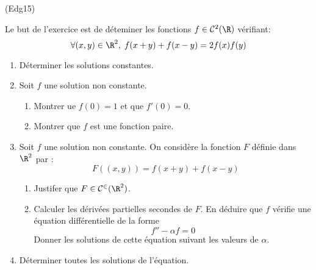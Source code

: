 \begin{tiny}(Edg15)\end{tiny} Le but de l'exercice est de déteminer les fonctions $f\in \mathcal{C}^2(\R)$ vérifiant:
\begin{displaymath}
 \forall (x,y)\in \R^2,\; f(x+y)+f(x-y) = 2f(x)f(y)
\end{displaymath}
 \begin{enumerate}
  \item Déterminer les solutions constantes.
  \item Soit $f$ une solution non constante.
\begin{enumerate}
 \item Montrer ue $f(0)=1$ et que $f'(0)=0$.
 \item Montrer que $f$ est une fonction paire.
\end{enumerate}
\item  Soit $f$ une solution non constante. On considère la fonction $F$ définie dans $\R^2$ par :
\begin{displaymath}
 F((x,y))=f(x+y)+f(x-y)
\end{displaymath}
\begin{enumerate}
 \item Justifer que $F\in \mathcal{C^2}(\R^2)$.
 \item Calculer les dérivées partielles secondes de $F$. En déduire que $f$ vérifie une équation différentielle de la forme
\begin{displaymath}
 f''-\alpha f = 0
\end{displaymath}
Donner les solutions de cette équation suivant les valeurs de $\alpha$.
\end{enumerate}
\item Déterminer toutes les solutions de l'équation.
 \end{enumerate}
